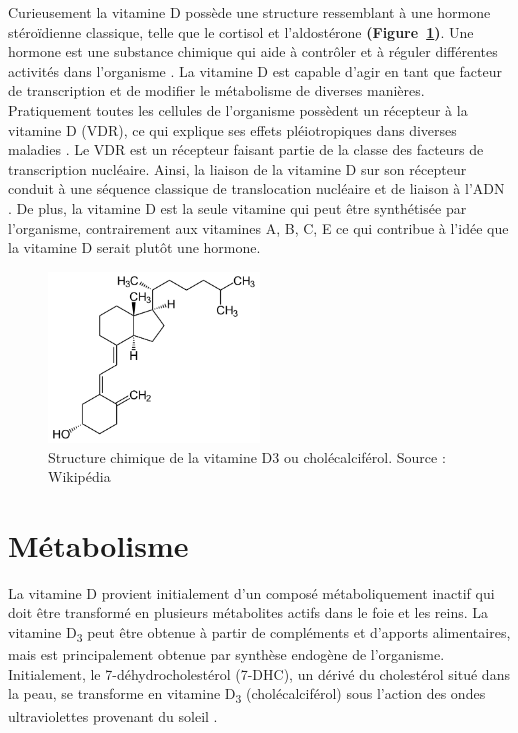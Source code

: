 \documentclass[
  a4paper,
  DIV=11,
  numbers=noendperiod,
  listof=totoc]{scrreprt}
\begin{document}
Curieusement la vitamine D possède une structure ressemblant à une
hormone stéroïdienne classique, telle que le cortisol et l'aldostérone
\autocite{Norman.2008} \textbf{(Figure~\ref{fig-vitd3})}. Une hormone
est une substance chimique qui aide à contrôler et à réguler différentes
activités dans l'organisme \autocite{Ellison.2020}. La vitamine D est
capable d'agir en tant que facteur de transcription et de modifier le
métabolisme de diverses manières. Pratiquement toutes les cellules de
l'organisme possèdent un récepteur à la vitamine D (VDR), ce qui
explique ses effets pléiotropiques dans diverses maladies
\autocite{Ellison.2020,Caprio.2017,Norman.2008}. Le VDR est un récepteur
faisant partie de la classe des facteurs de transcription nucléaire.
Ainsi, la liaison de la vitamine D sur son récepteur conduit à une
séquence classique de translocation nucléaire et de liaison à l'ADN
\autocite{Bouillon.2008}. De plus, la vitamine D est la seule vitamine
qui peut être synthétisée par l'organisme, contrairement aux vitamines
A, B, C, E ce qui contribue à l'idée que la vitamine D serait plutôt une
hormone.

\begin{figure}

{\centering \includegraphics[width=0.5\textwidth,height=\textheight]{figures/vitamin-d3.png}

}

\caption{\label{fig-vitd3}Structure chimique de la vitamine D3 ou
cholécalciférol. Source : Wikipédia}

\end{figure}

\hypertarget{muxe9tabolisme}{%
\section{Métabolisme}\label{muxe9tabolisme}}

La vitamine D provient initialement d'un composé métaboliquement inactif
qui doit être transformé en plusieurs métabolites actifs dans le foie et
les reins. La vitamine D\textsubscript{3} peut être obtenue à partir de
compléments et d'apports alimentaires, mais est principalement obtenue
par synthèse endogène de l'organisme. Initialement, le
7-déhydrocholestérol (7-DHC), un dérivé du cholestérol situé dans la
peau, se transforme en vitamine D\textsubscript{3} (cholécalciférol)
sous l'action des ondes ultraviolettes provenant du soleil
\autocite{Bikle.2014}.
\end{document}
